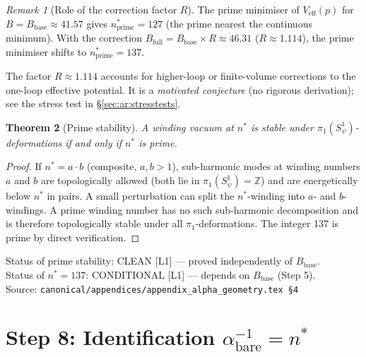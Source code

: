 \documentclass[12pt,a4paper]{article}
\newtheorem{theorem}{Theorem}[section]
\theoremstyle{definition}
\theoremstyle{remark}
\newtheorem{remark}[theorem]{Remark}
\begin{document}
\begin{remark}[Role of the correction factor $R$]
\label{rem:ar:Rfactor}
The prime minimiser of $V_{\mathrm{eff}}(p)$ for $B = B_{\mathrm{base}} \approx 41.57$
gives $n^*_{\mathrm{prime}} = 127$ (the prime nearest the continuous minimum).
With the correction $B_{\mathrm{full}} = B_{\mathrm{base}} \times R \approx 46.31$
($R \approx 1.114$), the prime minimiser shifts to $n^*_{\mathrm{prime}} = 137$.

The factor $R \approx 1.114$ accounts for higher-loop or finite-volume corrections
to the one-loop effective potential.  It is a \emph{motivated conjecture} (no
rigorous derivation); see the stress test in \S\ref{sec:ar:stresstests}.
\end{remark}

\begin{theorem}[Prime stability]
\label{thm:ar:prime_stability}
A winding vacuum at $n^*$ is stable under $\pi_1(S^1_\psi)$-deformations if and
only if $n^*$ is prime.
\end{theorem}

\begin{proof}
If $n^* = a \cdot b$ (composite, $a,b > 1$), sub-harmonic modes at winding numbers
$a$ and $b$ are topologically allowed (both lie in $\pi_1(S^1_\psi) = \mathbb{Z}$)
and are energetically below $n^*$ in pairs.  A small perturbation can split the
$n^*$-winding into $a$- and $b$-windings.  A prime winding number has no such
sub-harmonic decomposition and is therefore topologically stable under all
$\pi_1$-deformations.  The integer 137 is prime by direct verification.
\end{proof}

\begin{resultbox}
Status of prime stability: CLEAN [L1] — proved independently of $B_{\mathrm{base}}$.\\
Status of $n^* = 137$: CONDITIONAL [L1] — depends on $B_{\mathrm{base}}$ (Step 5).\\
Source: \texttt{canonical/appendices/appendix\_alpha\_geometry.tex \S4}
\end{resultbox}

\section{Step 8: Identification $\alpha^{-1}_{\mathrm{bare}} = n^*$}
\label{sec:ar:identification}
\end{document}
